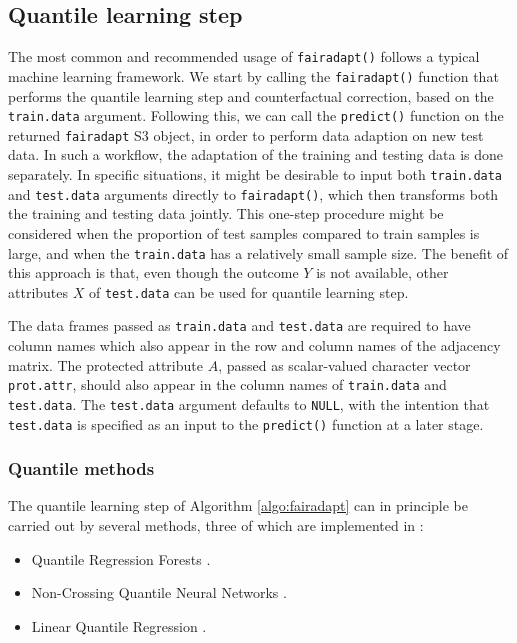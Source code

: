 \documentclass[
  nojss]{jss}
\providecommand{\tightlist}{%
  \setlength{\itemsep}{0pt}\setlength{\parskip}{0pt}}
\begin{document}
\hypertarget{quantile-learning-step}{%
\subsection{Quantile learning step}\label{quantile-learning-step}}

The most common and recommended usage of \texttt{fairadapt()} follows a
typical machine learning framework. We start by calling the
\texttt{fairadapt()} function that performs the quantile learning step
and counterfactual correction, based on the \texttt{train.data}
argument. Following this, we can call the \texttt{predict()} function on
the returned \texttt{fairadapt} S3 object, in order to perform data
adaption on new test data. In such a workflow, the adaptation of the
training and testing data is done separately. In specific situations, it
might be desirable to input both \texttt{train.data} and
\texttt{test.data} arguments directly to \texttt{fairadapt()}, which
then transforms both the training and testing data jointly. This
one-step procedure might be considered when the proportion of test
samples compared to train samples is large, and when the
\texttt{train.data} has a relatively small sample size. The benefit of
this approach is that, even though the outcome \(Y\) is not available,
other attributes \(X\) of \texttt{test.data} can be used for quantile
learning step.

The data frames passed as \texttt{train.data} and \texttt{test.data} are
required to have column names which also appear in the row and column
names of the adjacency matrix. The protected attribute \(A\), passed as
scalar-valued character vector \texttt{prot.attr}, should also appear in
the column names of \texttt{train.data} and \texttt{test.data}. The
\texttt{test.data} argument defaults to \texttt{NULL}, with the
intention that \texttt{test.data} is specified as an input to the
\texttt{predict()} function at a later stage.

\hypertarget{quantile-methods}{%
\subsubsection{Quantile methods}\label{quantile-methods}}

The quantile learning step of Algorithm \ref{algo:fairadapt} can in
principle be carried out by several methods, three of which are
implemented in :

\begin{itemize}
\tightlist
\item
  Quantile Regression Forests
  \citep{meinshausen2006qrf, wright2015ranger}.
\item
  Non-Crossing Quantile Neural Networks
  \citep{cannon2018non, cannon2015package}.
\item
  Linear Quantile Regression \citep{koenker2001qr, koenker2018package}.
\end{itemize}
\end{document}
